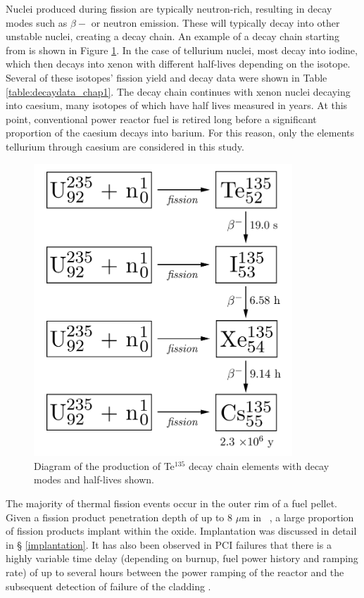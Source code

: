 Nuclei produced during fission are typically neutron-rich, resulting in decay modes such as $\beta-$ or neutron emission. These will typically decay into other unstable nuclei, creating a decay chain. An example of a decay chain starting from  is shown in Figure \ref{fig:decaychain}. In the case of tellurium nuclei, most decay into iodine, which then decays into xenon with different half-lives depending on the isotope. Several of these isotopes' fission yield and decay data were shown in Table \ref{table:decaydata_chap1}. The decay chain continues with xenon nuclei decaying into caesium, many isotopes of which have half lives measured in years. At this point, conventional power reactor fuel is retired long before a significant proportion of the caesium decays into barium. For this reason, only the elements tellurium through caesium are considered in this study. 

\begin{figure}[ht] %
    \centering
    \includegraphics[height=11cm]{images/te_decay_chain2.png}
    \caption{Diagram of the production of Te$^{135}$ decay chain elements with decay modes and half-lives shown.}
    \label{fig:decaychain}
\end{figure}

The majority of thermal fission events occur in the outer rim of a fuel pellet. Given a fission product penetration depth of up to 8 $\mu$m in \zirconia\ \cite{degueldre2001behaviour}, a large proportion of fission products implant within the oxide. Implantation was discussed in detail in § \ref{implantation}. It has also been observed in PCI failures that there is a highly variable time delay (depending on burnup, fuel power history and ramping rate) of up to several hours between the power ramping of the reactor and the subsequent detection of failure of the cladding \cite{bergenlid1980experimental, wood1983effects, pankaskie1981mechanistic}. 

